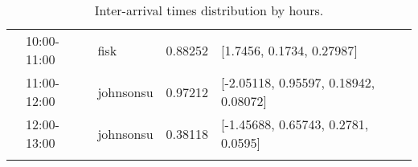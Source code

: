\begin{longtable}[c]{llllp{5cm}}
\textbf{}             & 10:00-11:00            & fisk                  & 0.88252          & {[}1.7456, 0.1734, 0.27987{]}                          \\
\textbf{}             & 11:00-12:00            & johnsonsu             & 0.97212          & {[}-2.05118, 0.95597, 0.18942, 0.08072{]}              \\
\textbf{}             & 12:00-13:00            & johnsonsu             & 0.38118          & {[}-1.45688, 0.65743, 0.2781, 0.0595{]}              \\\hline
\caption{Inter-arrival times distribution by hours.}
\label{tab:int_dist}\\
\end{longtable}
